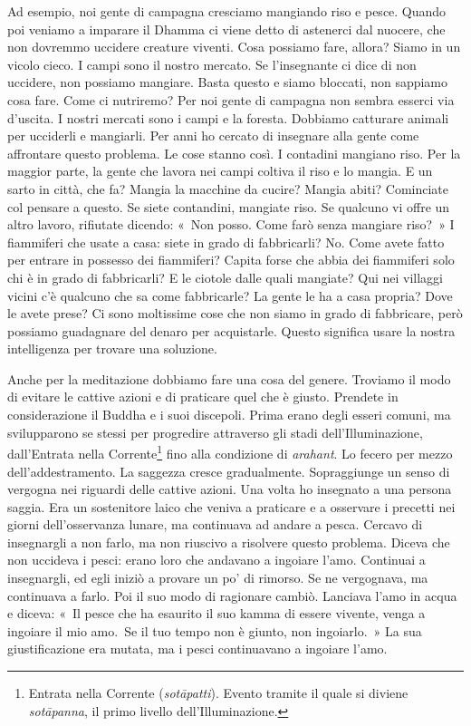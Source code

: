 Ad esempio, noi gente di campagna cresciamo mangiando riso e pesce.
Quando poi veniamo a imparare il Dhamma ci viene detto di astenerci dal
nuocere, che non dovremmo uccidere creature viventi. Cosa possiamo fare,
allora? Siamo in un vicolo cieco. I campi sono il nostro mercato. Se
l'insegnante ci dice di non uccidere, non possiamo mangiare. Basta
questo e siamo bloccati, non sappiamo cosa fare. Come ci nutriremo? Per
noi gente di campagna non sembra esserci via d'uscita. I nostri mercati
sono i campi e la foresta. Dobbiamo catturare animali per ucciderli e
mangiarli. Per anni ho cercato di insegnare alla gente come affrontare
questo problema. Le cose stanno così. I contadini mangiano riso. Per la
maggior parte, la gente che lavora nei campi coltiva il riso e lo
mangia. E un sarto in città, che fa? Mangia la macchine da cucire?
Mangia abiti? Cominciate col pensare a questo. Se siete contandini,
mangiate riso. Se qualcuno vi offre un altro lavoro, rifiutate dicendo:
«~Non posso. Come farò senza mangiare riso?~» I fiammiferi che usate a
casa: siete in grado di fabbricarli? No. Come avete fatto per entrare in
possesso dei fiammiferi? Capita forse che abbia dei fiammiferi solo chi
è in grado di fabbricarli? E le ciotole dalle quali mangiate? Qui nei
villaggi vicini c'è qualcuno che sa come fabbricarle? La gente le ha a
casa propria? Dove le avete prese? Ci sono moltissime cose che non siamo
in grado di fabbricare, però possiamo guadagnare del denaro per
acquistarle. Questo significa usare la nostra intelligenza per trovare
una soluzione.

Anche per la meditazione dobbiamo fare una cosa del genere. Troviamo il
modo di evitare le cattive azioni e di praticare quel che è giusto.
Prendete in considerazione il Buddha e i suoi discepoli. Prima erano
degli esseri comuni, ma svilupparono se stessi per progredire attraverso
gli stadi dell'Illuminazione, dall'Entrata nella Corrente\footnote{Entrata
  nella Corrente (\emph{sotāpatti}). Evento tramite il quale si diviene
  \emph{sotāpanna}, il primo livello dell'Illuminazione.} fino alla
condizione di \emph{arahant}. Lo fecero per mezzo dell'addestramento.
La saggezza cresce gradualmente. Sopraggiunge un senso di vergogna nei
riguardi delle cattive azioni. Una volta ho insegnato a una persona
saggia. Era un sostenitore laico che veniva a praticare e a osservare i
precetti nei giorni dell'osservanza lunare, ma continuava ad andare a
pesca. Cercavo di insegnargli a non farlo, ma non riuscivo a risolvere
questo problema. Diceva che non uccideva i pesci: erano loro che
andavano a ingoiare l'amo. Continuai a insegnargli, ed egli iniziò a
provare un po' di rimorso. Se ne vergognava, ma continuava a farlo. Poi
il suo modo di ragionare cambiò. Lanciava l'amo in acqua e diceva: «~Il
pesce che ha esaurito il suo kamma di essere vivente, venga a
ingoiare il mio amo.~Se il tuo tempo non è giunto, non ingoiarlo.~» La
sua giustificazione era mutata, ma i pesci continuavano a ingoiare
l'amo.

